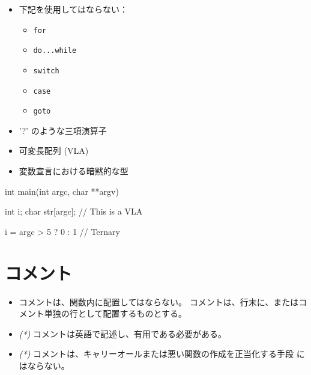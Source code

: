 \documentclass{42-ja}
\begin{document}
        \begin{itemize}

            \item 下記を使用してはならない：

                \begin{itemize}

                    \item \texttt{for}
                    \item \texttt{do...while}
                    \item \texttt{switch}
                    \item \texttt{case}
                    \item \texttt{goto}

                \end{itemize}

            \item '?' のような三項演算子

            \item 可変長配列 (VLA)

            \item 変数宣言における暗黙的な型

        \end{itemize}

\vspace{1cm}

\begin{42ccode}
  int main(int argc, char **argv)
  {
      int     i;
      char    str[argc]; // This is a VLA

      i = argc > 5 ? 0 : 1 // Ternary
  }
      \end{42ccode}
      \newpage

    \section{コメント}

        \begin{itemize}

        \item コメントは、関数内に配置してはならない。
          コメントは、行末に、またはコメント単独の行として配置するものとする。

        \item \textit{(*)} コメントは英語で記述し、有用である必要がある。

        \item  \textit{(*)} コメントは、キャリーオールまたは悪い関数の作成を正当化する手段
          にはならない。

        \end{itemize}
\end{document}

